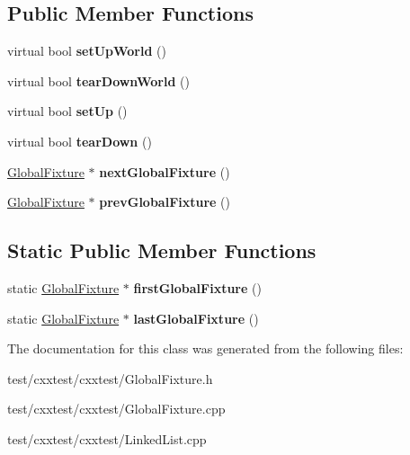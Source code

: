 \subsection*{Public Member Functions}
\begin{DoxyCompactItemize}
\item 
\hypertarget{classCxxTest_1_1GlobalFixture_a38d38d51f0bf725262bdc52915a2c7ab}{virtual bool {\bfseries set\-Up\-World} ()}\label{classCxxTest_1_1GlobalFixture_a38d38d51f0bf725262bdc52915a2c7ab}

\item 
\hypertarget{classCxxTest_1_1GlobalFixture_afefd57ebe829308b138d40580e8f935d}{virtual bool {\bfseries tear\-Down\-World} ()}\label{classCxxTest_1_1GlobalFixture_afefd57ebe829308b138d40580e8f935d}

\item 
\hypertarget{classCxxTest_1_1GlobalFixture_a5edcee94174c4452e6a3d4cd6c190b74}{virtual bool {\bfseries set\-Up} ()}\label{classCxxTest_1_1GlobalFixture_a5edcee94174c4452e6a3d4cd6c190b74}

\item 
\hypertarget{classCxxTest_1_1GlobalFixture_a0d79953ba5fb3f0ec5bf2e6d2fa0a1d1}{virtual bool {\bfseries tear\-Down} ()}\label{classCxxTest_1_1GlobalFixture_a0d79953ba5fb3f0ec5bf2e6d2fa0a1d1}

\item 
\hypertarget{classCxxTest_1_1GlobalFixture_a514b06f4054d3150681116e832fe82d2}{\hyperlink{classCxxTest_1_1GlobalFixture}{Global\-Fixture} $\ast$ {\bfseries next\-Global\-Fixture} ()}\label{classCxxTest_1_1GlobalFixture_a514b06f4054d3150681116e832fe82d2}

\item 
\hypertarget{classCxxTest_1_1GlobalFixture_a319015cb471dc253e2cd540283724853}{\hyperlink{classCxxTest_1_1GlobalFixture}{Global\-Fixture} $\ast$ {\bfseries prev\-Global\-Fixture} ()}\label{classCxxTest_1_1GlobalFixture_a319015cb471dc253e2cd540283724853}

\end{DoxyCompactItemize}
\subsection*{Static Public Member Functions}
\begin{DoxyCompactItemize}
\item 
\hypertarget{classCxxTest_1_1GlobalFixture_ad003581f56210ef50c7edc2275b14f3b}{static \hyperlink{classCxxTest_1_1GlobalFixture}{Global\-Fixture} $\ast$ {\bfseries first\-Global\-Fixture} ()}\label{classCxxTest_1_1GlobalFixture_ad003581f56210ef50c7edc2275b14f3b}

\item 
\hypertarget{classCxxTest_1_1GlobalFixture_a7ceddff923c9e2f138f3a28eda2e0a6f}{static \hyperlink{classCxxTest_1_1GlobalFixture}{Global\-Fixture} $\ast$ {\bfseries last\-Global\-Fixture} ()}\label{classCxxTest_1_1GlobalFixture_a7ceddff923c9e2f138f3a28eda2e0a6f}

\end{DoxyCompactItemize}


The documentation for this class was generated from the following files\-:\begin{DoxyCompactItemize}
\item 
test/cxxtest/cxxtest/Global\-Fixture.\-h\item 
test/cxxtest/cxxtest/Global\-Fixture.\-cpp\item 
test/cxxtest/cxxtest/Linked\-List.\-cpp\end{DoxyCompactItemize}
